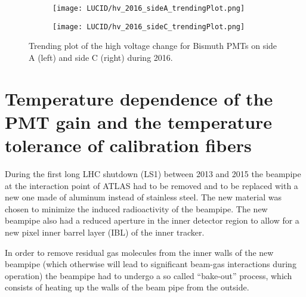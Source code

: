 \begin{figure}
\centering
\begin{subfigure}{.5\textwidth}
  \centering
  \texttt{[image: LUCID/hv\_2016\_sideA\_trendingPlot.png]}
  \label{fig:sub3}
\end{subfigure}%
\begin{subfigure}{.5\textwidth}
  \centering
  \texttt{[image: LUCID/hv\_2016\_sideC\_trendingPlot.png]}
  \label{fig:sub4}
\end{subfigure}
\caption{Trending plot of the high voltage change for Bismuth PMTs on side A (left) and side C (right) during 2016.}
\label{fig:hv_trending_plot_2016}
\end{figure}




% 
% 

\section{Temperature dependence of the PMT gain and the temperature tolerance of calibration fibers}
\label{sec:tempMeas}

During the first long LHC shutdown (LS1) between 2013 and 2015 the beampipe at the interaction point of ATLAS
had to be removed and to be replaced with a new one made of aluminum instead of stainless steel.
The new material was chosen to minimize the induced radioactivity of the beampipe.
The new beampipe also had a reduced aperture in the inner detector region to allow for a new pixel inner barrel layer (IBL) of the inner tracker.

In order to remove residual gas molecules from the inner walls of the new beampipe (which otherwise will lead to significant beam-gas interactions during operation)
the beampipe had to undergo a so called ``bake-out'' process, which consists of heating up the walls of the beam pipe from the outside.

